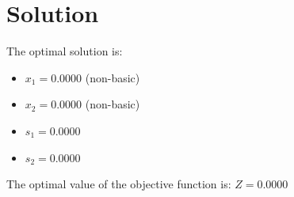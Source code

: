 \section*{Solution}
The optimal solution is:
\begin{itemize}
\item $x_{1} = 0.0000$ (non-basic)
\item $x_{2} = 0.0000$ (non-basic)
\item $s_{1} = 0.0000$
\item $s_{2} = 0.0000$
\end{itemize}
The optimal value of the objective function is: $Z = 0.0000$


